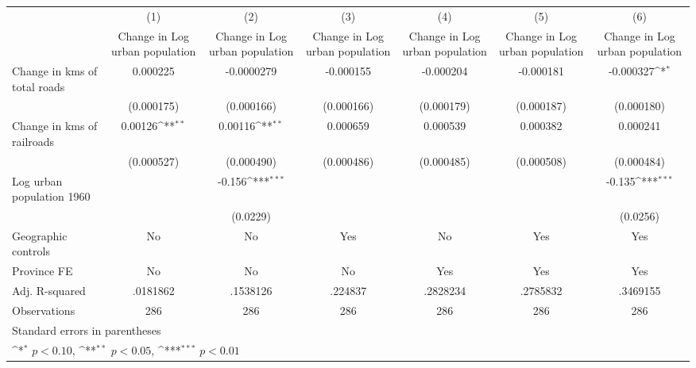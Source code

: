 {
\def\sym#1{\ifmmode^{#1}\else\(^{#1}\)\fi}
\begin{tabular}{l*{6}{c}}
\hline\hline
                    &\multicolumn{1}{c}{(1)}&\multicolumn{1}{c}{(2)}&\multicolumn{1}{c}{(3)}&\multicolumn{1}{c}{(4)}&\multicolumn{1}{c}{(5)}&\multicolumn{1}{c}{(6)}\\
                    &\multicolumn{1}{c}{Change in Log urban population}&\multicolumn{1}{c}{Change in Log urban population}&\multicolumn{1}{c}{Change in Log urban population}&\multicolumn{1}{c}{Change in Log urban population}&\multicolumn{1}{c}{Change in Log urban population}&\multicolumn{1}{c}{Change in Log urban population}\\
\hline
Change in kms of total roads&    0.000225         &  -0.0000279         &   -0.000155         &   -0.000204         &   -0.000181         &   -0.000327\sym{*}  \\
                    &  (0.000175)         &  (0.000166)         &  (0.000166)         &  (0.000179)         &  (0.000187)         &  (0.000180)         \\
[1em]
Change in kms of railroads&     0.00126\sym{**} &     0.00116\sym{**} &    0.000659         &    0.000539         &    0.000382         &    0.000241         \\
                    &  (0.000527)         &  (0.000490)         &  (0.000486)         &  (0.000485)         &  (0.000508)         &  (0.000484)         \\
[1em]
Log urban population 1960&                     &      -0.156\sym{***}&                     &                     &                     &      -0.135\sym{***}\\
                    &                     &    (0.0229)         &                     &                     &                     &    (0.0256)         \\
\hline
Geographic controls &          No         &          No         &         Yes         &          No         &         Yes         &         Yes         \\
Province FE         &          No         &          No         &          No         &         Yes         &         Yes         &         Yes         \\
Adj. R-squared      &    .0181862         &    .1538126         &     .224837         &    .2828234         &    .2785832         &    .3469155         \\
Observations        &         286         &         286         &         286         &         286         &         286         &         286         \\
\hline\hline
\multicolumn{7}{l}{\footnotesize Standard errors in parentheses}\\
\multicolumn{7}{l}{\footnotesize \sym{*} \(p<0.10\), \sym{**} \(p<0.05\), \sym{***} \(p<0.01\)}\\
\end{tabular}
}
